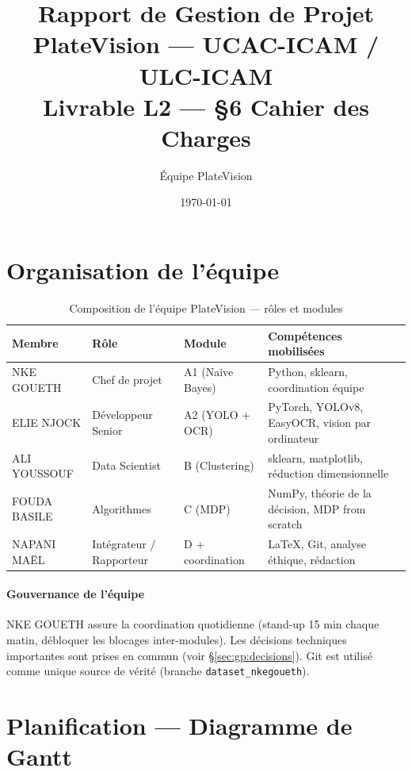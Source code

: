 \documentclass[12pt,a4paper]{article}
\title{\textbf{Rapport de Gestion de Projet}\\[0.5em]
\large PlateVision --- UCAC-ICAM / ULC-ICAM\\[0.3em]
\normalsize Livrable L2 --- §6 Cahier des Charges}
\author{\'{E}quipe PlateVision}
\date{\today}
\begin{document}
\maketitle
\tableofcontents
\newpage

\section{Organisation de l'\'{e}quipe}
\label{sec:gp:equipe}

\begin{table}[H]
\centering
\caption{Composition de l'\'{e}quipe PlateVision --- r\^{o}les et modules}
\label{tab:gp:equipe}
\begin{tabular}{llll}
\toprule
\textbf{Membre} & \textbf{R\^{o}le} & \textbf{Module} & \textbf{Comp\'{e}tences mobilis\'{e}es} \\
\midrule
NKE GOUETH
  & Chef de projet
  & A1 (Naive Bayes)
  & Python, sklearn, coordination \'{e}quipe \\
ELIE NJOCK
  & D\'{e}veloppeur Senior
  & A2 (YOLO + OCR)
  & PyTorch, YOLOv8, EasyOCR, vision par ordinateur \\
ALI YOUSSOUF
  & Data Scientist
  & B (Clustering)
  & sklearn, matplotlib, r\'{e}duction dimensionnelle \\
FOUDA BASILE
  & Algorithmes
  & C (MDP)
  & NumPy, th\'{e}orie de la d\'{e}cision, MDP from scratch \\
NAPANI MA\"{E}L
  & Int\'{e}grateur / Rapporteur
  & D + coordination
  & \LaTeX{}, Git, analyse \'{e}thique, r\'{e}daction \\
\bottomrule
\end{tabular}
\end{table}

\paragraph{Gouvernance de l'\'{e}quipe}
NKE GOUETH assure la coordination quotidienne (stand-up 15 min chaque
matin, d\'{e}bloquer les blocages inter-modules). Les d\'{e}cisions
techniques importantes sont prises en commun (voir §\ref{sec:gp:decisions}).
Git est utilis\'{e} comme unique source de v\'{e}rit\'{e} (branche
\texttt{dataset\_nkegoueth}).

\section{Planification --- Diagramme de Gantt}
\label{sec:gp:gantt}
\end{document}
